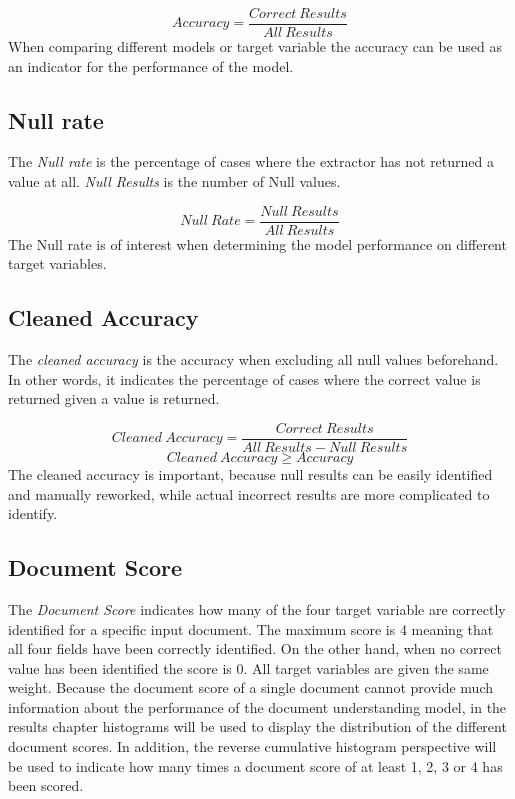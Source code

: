 \[ Accuracy = \frac{Correct \ Results}{All \ Results}\]
When comparing different models or target variable the accuracy can be used as an indicator for the performance of the model.
\subsection{Null rate}
The \textit{Null rate} is the percentage of cases where the extractor has not returned a value at all. \textit{Null Results} is the number of Null values.

\[ Null \ Rate = \frac{Null \ Results}{All \ Results}\]
The Null rate is of interest when determining the model performance on different target variables.
\subsection{Cleaned Accuracy}
The \textit{cleaned accuracy} is the accuracy when excluding all null values beforehand. In other words, it indicates the percentage of cases where the correct value is returned given a value is returned.

\[ Cleaned \ Accuracy = \frac{Correct \ Results}{All \ Results - Null \ Results}\] 
\[Cleaned \ Accuracy \geq Accuracy\]
The cleaned accuracy is important, because null results can be easily identified and manually reworked, while actual incorrect results are more complicated to identify.
\subsection{Document Score}
The \textit{Document Score} indicates how many of the four target variable are correctly identified for a specific input document.
The maximum score is 4 meaning that all four fields have been correctly identified. On the other hand, when no correct value has been identified
the score is 0. All target variables are given the same weight.
Because the document score of a single document cannot provide much information about the performance of the document understanding model, in the results chapter histograms will be used to display the distribution of the different document scores. In addition, the reverse cumulative histogram perspective will be used to indicate how many times a document score of at least 1, 2, 3 or 4 has been scored.